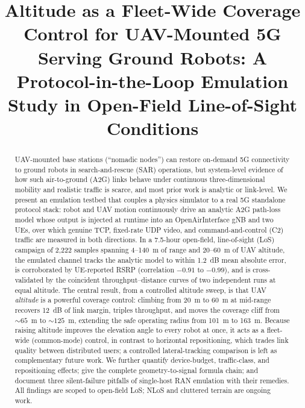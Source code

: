 \documentclass[10pt, conference]{IEEEtran}
\begin{document}
\title{Altitude as a Fleet-Wide Coverage Control for UAV-Mounted 5G Serving Ground Robots: A Protocol-in-the-Loop Emulation Study in Open-Field Line-of-Sight Conditions}

\author{
\and
{}
}

\maketitle

\begin{abstract}
UAV-mounted base stations (``nomadic nodes'') can restore on-demand 5G connectivity to ground robots in search-and-rescue (SAR) operations, but system-level evidence of how such air-to-ground (A2G) links behave under continuous three-dimensional mobility and realistic traffic is scarce, and most prior work is analytic or link-level. We present an emulation testbed that couples a physics simulator to a real 5G standalone protocol stack: robot and UAV motion continuously drive an analytic A2G path-loss model whose output is injected at runtime into an OpenAirInterface gNB and two UEs, over which genuine TCP, fixed-rate UDP video, and command-and-control (C2) traffic are measured in both directions. In a 7.5-hour open-field, line-of-sight (LoS) campaign of 2{,}222 samples spanning 4--140~m of range and 20--60~m of UAV altitude, the emulated channel tracks the analytic model to within 1.2~dB mean absolute error, is corroborated by UE-reported RSRP (correlation $-0.91$ to $-0.99$), and is cross-validated by the coincident throughput--distance curves of two independent runs at equal altitude. The central result, from a controlled altitude sweep, is that UAV \emph{altitude} is a powerful coverage control: climbing from 20~m to 60~m at mid-range recovers 12~dB of link margin, triples throughput, and moves the coverage cliff from ${\sim}65$~m to ${\sim}125$~m, extending the safe operating radius from 101~m to 163~m. Because raising altitude improves the elevation angle to every robot at once, it acts as a fleet-wide (common-mode) control, in contrast to horizontal repositioning, which trades link quality between distributed users; a controlled lateral-tracking comparison is left as complementary future work. We further quantify device-budget, traffic-class, and repositioning effects; give the complete geometry-to-signal formula chain; and document three silent-failure pitfalls of single-host RAN emulation with their remedies. All findings are scoped to open-field LoS; NLoS and cluttered terrain are ongoing work.
\end{abstract}
\end{document}
